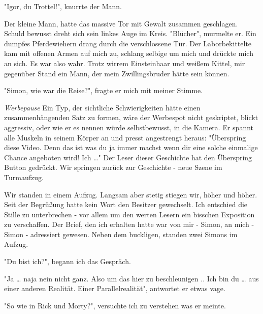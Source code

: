 \documentclass[ebook]{article}
\begin{document}
\begin{center}
"Igor, du Trottel!", knurrte der Mann.
\end{center}

\noindent Der kleine Mann, hatte das massive Tor mit Gewalt zusammen
geschlagen. Schuld bewusst dreht sich sein linkes Auge im
Kreis. "Blücher", murmelte er. Ein dumpfes Pferdewiehern drang durch
die verschlossene Tür. Der Laborbekittelte kam mit offenen Armen auf
mich zu, schlang selbige um mich und drückte mich an sich. Es war
also wahr. Trotz wirrem Einsteinhaar und weißem Kittel, mir
gegenüber Stand ein Mann, der mein Zwillingsbruder hätte sein
können.

\begin{center}
"Simon, wie war die Reise?", fragte er mich mit meiner Stimme.
\end{center}

\noindent \emph{Werbepause} \newline \noindent Ein Typ, der sichtliche
Schwierigkeiten hätte einen zusammenhängenden Satz zu formen, wäre
der Werbespot nicht geskriptet, blickt aggressiv, oder wie er es
nennen würde selbstbewusst, in die Kamera. Er spannt alle Muskeln in
seinem Körper an und presst angestrengt heraus: "Überspring diese
Video. Denn das ist was du ja immer machst wenn dir eine solche
einmalige Chance angeboten wird! Ich \ldots{}" Der Leser dieser
Geschichte hat den Überspring Button gedrückt. Wir springen zurück
zur Geschichte - neue Szene im Turmaufzug.

\noindent Wir standen in einem Aufzug. Langsam aber stetig stiegen
wir, höher und höher. Seit der Begrüßung hatte kein Wort den
Besitzer gewechselt. Ich entschied die Stille zu unterbrechen -
vor allem um den werten Lesern ein bisschen Exposition zu
verschaffen. Der Brief, den ich erhalten hatte war von mir - Simon,
an mich - Simon - adressiert gewesen. Neben dem buckligen, standen
zwei Simons im Aufzug.

\begin{center}
"Du bist ich?", begann ich das Gespräch.
\end{center}

\begin{center}
"Ja \ldots{} naja nein nicht ganz. Also um das hier zu beschleunigen
.. Ich bin du \ldots{} aus einer anderen Realität. Einer
Parallelrealität", antwortet er etwas vage.
\end{center}

\begin{center}
"So wie in Rick und Morty?", versuchte ich zu verstehen was er
meinte.
\end{center}
\end{document}
